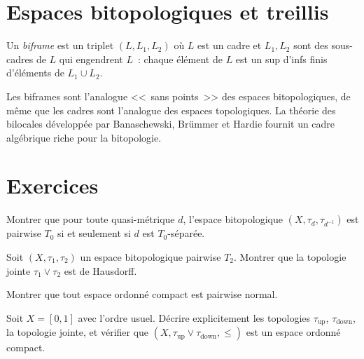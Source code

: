 \section{Espaces bitopologiques et treillis}

\begin{definition}[Biframe]
Un \emph{biframe} est un triplet $(L, L_1, L_2)$ o\`u $L$ est un cadre et $L_1, L_2$
sont des sous-cadres de $L$ qui engendrent $L$~: chaque \'el\'ement de $L$ est un sup
d'infs finis d'\'el\'ements de $L_1 \cup L_2$.
\end{definition}

\begin{remarque}
Les biframes sont l'analogue <<~sans points~>> des espaces bitopologiques, de m\^eme que
les cadres sont l'analogue des espaces topologiques. La th\'eorie des bilocales
d\'evelopp\'ee par Banaschewski, Br\"ummer et Hardie fournit un cadre alg\'ebrique riche
pour la bitopologie.
\end{remarque}

\section{Exercices}

\begin{exercice}
Montrer que pour toute quasi-m\'etrique $d$, l'espace bitopologique
$(X,\tau_d,\tau_{d^{-1}})$ est pairwise $T_0$ si et seulement si $d$ est $T_0$-s\'epar\'ee.
\end{exercice}

\begin{exercice}
Soit $(X,\tau_1,\tau_2)$ un espace bitopologique pairwise $T_2$. Montrer que la topologie
jointe $\tau_1 \vee \tau_2$ est de Hausdorff.
\end{exercice}

\begin{exercice}
Montrer que tout espace ordonn\'e compact est pairwise normal.
\end{exercice}

\begin{exercice}
Soit $X = [0,1]$ avec l'ordre usuel. D\'ecrire explicitement les topologies
$\tau_{\mathrm{up}}$, $\tau_{\mathrm{down}}$, la topologie jointe, et v\'erifier que
$(X, \tau_{\mathrm{up}} \vee \tau_{\mathrm{down}}, \leq)$ est un espace ordonn\'e compact.
\end{exercice}


